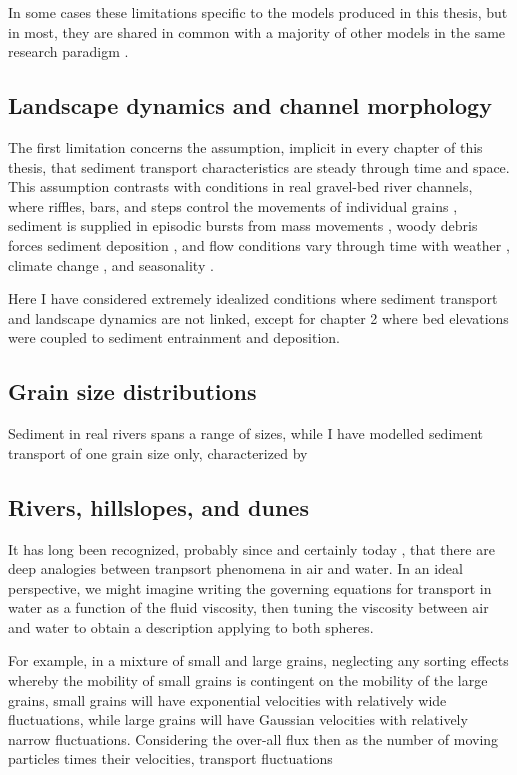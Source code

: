 In some cases these limitations specific to the models produced in this thesis, but in most, they are shared in common with a majority of other models in the same research paradigm \citep{Ancey2020,Furbish2021a}.

\subsection{Landscape dynamics and channel morphology}

The first limitation concerns the assumption, implicit in every chapter of this thesis, that sediment transport characteristics are steady through time and space.
This assumption contrasts with conditions in real gravel-bed river channels, where riffles, bars, and steps control the movements of individual grains \citep{}, sediment is supplied in episodic bursts from mass movements \citep{}, woody debris forces sediment deposition \citep{}, and flow conditions vary through time with weather \citep{}, climate change \citep{}, and seasonality \citep{}.

Here I have considered extremely idealized conditions where sediment transport and landscape dynamics are not linked, except for chapter 2 where bed elevations were coupled to sediment entrainment and deposition.




\subsection{Grain size distributions}

Sediment in real rivers spans a range of sizes, while I have modelled sediment transport of one grain size only, characterized by 

\subsection{Rivers, hillslopes, and dunes}


It has long been recognized, probably since \citet{Bagnold1941} and certainly today \citep{}, that there are deep analogies between tranpsort phenomena in air and water.
In an ideal perspective, we might imagine writing the governing equations for transport in water as a function of the fluid viscosity, then tuning the viscosity between air and water to obtain a description applying to both spheres.


For example, in a mixture of small and large grains, neglecting any sorting effects whereby the mobility of small grains is contingent on the mobility of the large grains, small grains will have exponential velocities with relatively wide fluctuations, while large grains will have Gaussian velocities with relatively narrow fluctuations. Considering the over-all flux then as the number of moving particles times their velocities, transport fluctuations



